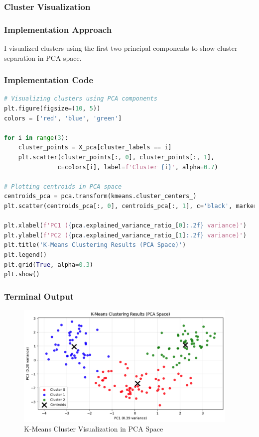 \documentclass[12pt,a4paper]{article}
\begin{document}
\subsubsection{Cluster Visualization}

\subsubsection{Implementation Approach}
I visualized clusters using the first two principal components to show cluster separation in PCA space.

\subsubsection{Implementation Code}
\begin{lstlisting}[language=Python, caption=Cluster Visualization in PCA Space]
# Visualizing clusters using PCA components
plt.figure(figsize=(10, 5))
colors = ['red', 'blue', 'green']

for i in range(3):
    cluster_points = X_pca[cluster_labels == i]
    plt.scatter(cluster_points[:, 0], cluster_points[:, 1], 
               c=colors[i], label=f'Cluster {i}', alpha=0.7)

# Plotting centroids in PCA space
centroids_pca = pca.transform(kmeans.cluster_centers_)
plt.scatter(centroids_pca[:, 0], centroids_pca[:, 1], c='black', marker='x', s=200, linewidths=3, label='Centroids')

plt.xlabel(f'PC1 ({pca.explained_variance_ratio_[0]:.2f} variance)')
plt.ylabel(f'PC2 ({pca.explained_variance_ratio_[1]:.2f} variance)')
plt.title('K-Means Clustering Results (PCA Space)')
plt.legend()
plt.grid(True, alpha=0.3)
plt.show()
\end{lstlisting}

\newpage
\subsubsection{Terminal Output}
\begin{figure}[h!]
\centering
    \includegraphics[width=0.95\textwidth]{Figures/cluster_visualization.png}
    \caption{K-Means Cluster Visualization in PCA Space}
\end{figure}
\end{document}
